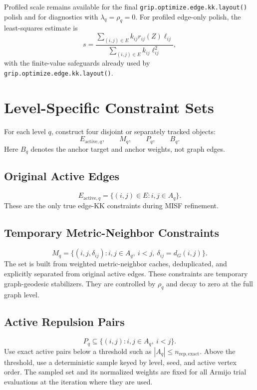 \documentclass[11pt]{article}
\newcommand{\Rfunc}[1]{\texttt{#1}}
\begin{document}
Profiled scale remains available for the final
\Rfunc{grip.optimize.edge.kk.layout()} polish and for diagnostics with
\(\lambda_q=\rho_q=0\). For profiled edge-only polish, the least-squares
estimate is
\[
  s
  =
  \frac{
    \sum_{(i,j)\in E}
    k_{ij} r_{ij}(Z) \ell_{ij}
  }{
    \sum_{(i,j)\in E}
    k_{ij} \ell_{ij}^2
  },
\]
with the finite-value safeguards already used by
\Rfunc{grip.optimize.edge.kk.layout()}.

\section{Level-Specific Constraint Sets}

For each level \(q\), construct four disjoint or separately tracked objects:
\[
  E_{\mathrm{active},q}, \qquad M_q, \qquad P_q, \qquad B_q.
\]
Here \(B_q\) denotes the anchor target and anchor weights, not graph edges.

\subsection{Original Active Edges}

\[
  E_{\mathrm{active},q}
  =
  \{(i,j)\in E : i,j\in A_q\}.
\]
These are the only true edge-KK constraints during MISF refinement.

\subsection{Temporary Metric-Neighbor Constraints}

\[
  M_q
  =
  \{(i,j,\delta_{ij}) : i,j\in A_q,\ i<j,\ \delta_{ij}=d_G(i,j)\}.
\]
The set is built from weighted metric-neighbor caches, deduplicated, and
explicitly separated from original active edges. These constraints are
temporary graph-geodesic stabilizers. They are controlled by \(\rho_q\) and
decay to zero at the full graph level.

\subsection{Active Repulsion Pairs}

\[
  P_q \subseteq \{(i,j): i,j\in A_q,\ i<j\}.
\]
Use exact active pairs below a threshold such as
\(|A_q|\le n_{\mathrm{rep,exact}}\). Above the threshold, use a deterministic
sample keyed by level, seed, and active vertex order. The sampled set and its
normalized weights are fixed for all Armijo trial evaluations at the iteration
where they are used.
\end{document}
